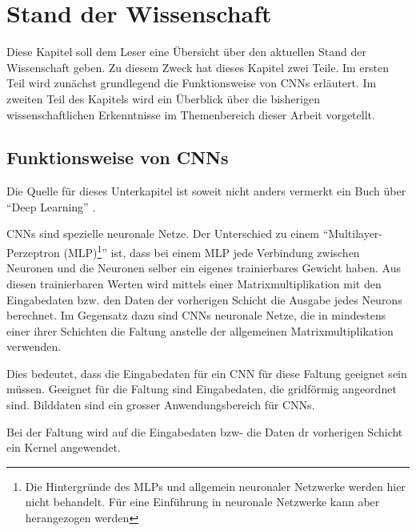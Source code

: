 \chapter{Stand der Wissenschaft}
Diese Kapitel soll dem Leser eine Übersicht über den aktuellen Stand der Wissenschaft geben. Zu diesem Zweck hat dieses Kapitel zwei Teile. Im ersten Teil wird zunächst grundlegend die Funktionsweise von CNNs erläutert. Im zweiten Teil des Kapitels wird ein Überblick über die bisherigen wissenschaftlichen Erkenntnisse im Themenbereich dieser Arbeit vorgetellt.
\section{Funktionsweise von CNNs}\label{sec:conv}
Die Quelle für dieses Unterkapitel ist soweit nicht anders vermerkt ein Buch über \enquote{Deep Learning} \cite{CNNBook}.

CNNs sind spezielle neuronale Netze. Der Unterschied zu einem \enquote{Multilayer-Perzeptron (MLP)\footnote{Die Hintergründe des MLPs und allgemein neuronaler Netzwerke werden hier nicht behandelt. Für eine Einführung in neuronale Netzwerke kann aber \cite{neural} herangezogen werden}} ist, dass bei einem MLP jede Verbindung zwischen Neuronen und die Neuronen selber ein eigenes trainierbares Gewicht haben. Aus diesen trainierbaren Werten wird mittels einer Matrixmultiplikation mit den Eingabedaten bzw. den Daten der vorherigen Schicht die Ausgabe jedes Neurons berechnet.
Im Gegensatz dazu sind CNNs neuronale Netze, die in mindestens einer ihrer Schichten die Faltung anstelle der allgemeinen Matrixmultiplikation verwenden.


Dies bedeutet, dass die Eingabedaten für ein CNN für diese Faltung geeignet sein müssen. Geeignet für die Faltung sind Eingabedaten, die gridförmig angeordnet sind. Bilddaten sind ein grosser Anwendungsbereich für CNNs.

Bei der Faltung wird auf die Eingabedaten bzw- die Daten dr vorherigen Schicht ein Kernel angewendet.

